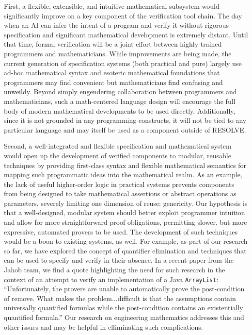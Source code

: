 First, a flexible, extensible, and intuitive mathematical subsystem would significantly improve on a key component of the verification tool chain.  The day when an AI can infer the intent of a program and verify it without rigorous specification and significant mathematical development is extremely distant.  Until that time, formal verification will be a joint effort between highly trained programmers and mathematicians.  While improvements are being made\cite{wenzelIsar}, the current generation of specification systems (both practical and pure) largely use ad-hoc mathematical syntax and esoteric mathematical foundations that programmers may find convenient but mathematicians find confusing and unweildy.  Beyond simply engendering collaboration between programmers and mathematicians, such a math-centered language design will encourage the full body of modern mathematical developments to be used directly.  Additionally, since it is not grounded in any programming constructs, it will not be tied to any particular language and may itself be used as a component outside of RESOLVE.

Second, a well-integrated and flexible specification and mathematical system would open up the development of verified components to modular, reusable techniques by providing first-class syntax and flexible mathematical semantics for mapping such programmatic ideas into the mathematical realm.  As an example, the lack of useful higher-order logic in practical systems prevents components from being designed to take mathematical assertions or abstract operations as parameters, severely limiting one dimension of reuse: genericity\cite{bronishMap}.  Our hypothesis is that a well-designed, modular system should better exploit programmer intuition and allow for more straightforward proof obligations, permitting slower, but more expressive, automated provers to be used.  The development of such techniques would be a boon to existing systems, as well.  For example, as part of our research so far, we have explored the concept of quantifier elimination and techniques that can be used to specify and verify in their absence.  In a recent paper from the Jahob team, we find a quote highlighting the need for such research in the context of an attempt to verify an implementation of a Java \texttt{ArrayList}: ``Unfortunately, the provers are unable to automatically prove the post-condition of remove.  What makes the problem...difficult is that the assumptions contain universally quantified formulas while the post-condition contains an existentially quantified formula.''  Our research on engineering mathematics addresses this and other issues and may be helpful in elliminating such complications.

